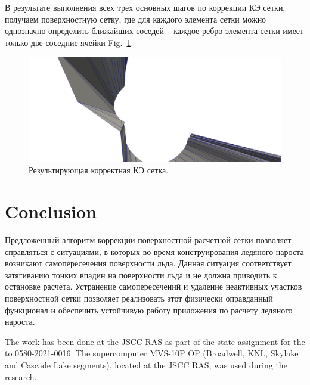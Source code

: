 \documentclass[
11pt,%
tightenlines,%
twoside,%
onecolumn,%
nofloats,%
nobibnotes,%
nofootinbib,%
superscriptaddress,%
noshowpacs,%
centertags]%
{revtex4}
\begin{document}
В результате выполнения всех трех основных шагов по коррекции КЭ сетки, получаем поверхностную сетку, где для каждого элемента сетки можно однозначно определить ближайших соседей – каждое ребро элемента сетки имеет только две соседние ячейки Fig.~\ref{fig:11}.

\begin{figure}[h]
\includegraphics[width=1.0\textwidth]{pics/pic_11.png}
\caption{Результирующая корректная КЭ сетка.}\label{fig:11}
\end{figure}

\section{Conclusion}

Предложенный алгоритм коррекции поверхностной расчетной сетки позволяет справляться с ситуациями, в которых во время конструирования ледяного нароста возникают самопересечения поверхности льда. Данная ситуация соответствует затягиванию тонких впадин на поверхности льда и не должна приводить к остановке расчета. Устранение самопересечений и удаление неактивных участков поверхностной сетки позволяет реализовать этот физически оправданный функционал и обеспечить устойчивую работу приложения по расчету ледяного нароста.

\begin{acknowledgments}
The work has been done at the JSCC RAS as part of the state assignment for the to 0580-2021-0016.
The supercomputer MVS-10P OP (Broadwell, KNL, Skylake and Cascade Lake segments), located at the JSCC RAS, was used during the research.
\end{acknowledgments}
\end{document}
